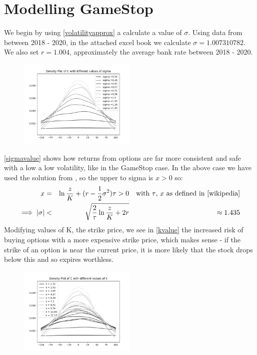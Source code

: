 \documentclass[11pt]{article} %
\begin{document}
\section{Modelling GameStop}
We begin by using \eqref{volatilityapprox} a calculate a value of $\sigma$. Using data from 
\cite{nyse} between 2018 - 2020, in the attached excel book we 
calculate $\sigma = 1.007310782$. We also set 
$r=1.004$, approximately the average bank rate between 2018 - 2020.
\begin{figure}[h] 
    \centering
    \includegraphics[width=0.5\textwidth]{sigmavalue.png} 
    \caption[]{}
    \label{sigmavalue}
\end{figure}
\eqref{sigmavalue} shows how returns from options are far more consistent and safe with a low a low volatility,
 like in the GameStop case. In the above case we have used the solution from \cite{wikipedia}, 
 so the upper to sigma is $x>0$ so:
\begin{align}
    x =&& \ln{\frac{z}{K}} + (r - \frac{1}{2} \sigma^2)\tau > 0 && 
    \text{with $\tau$, $x$ as defined in \cite{wikipedia}} \\
    \implies |\sigma| <&& \sqrt{\frac{2}{\tau} \ln{\frac{z}{K} + 2r}} && \approx 1.435
\end{align}
Modifying values of K, the strike price, we see in \eqref{kvalue} the increased risk 
of buying options with a more expensive strike price, which makes sense - if 
the strike of an option is near the current price, it is more likely that 
the stock drops below this and so expires worthless.
\begin{figure}[h] 
    \centering
    \includegraphics[width=0.5\textwidth]{kvalue.png} 
    \caption[]{}
    \label{kvalue}
\end{figure}
\end{document}
